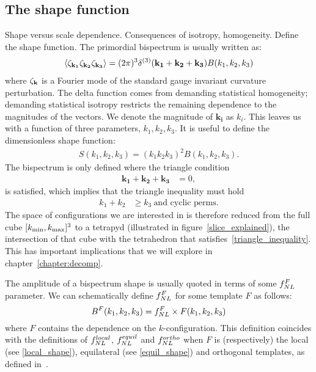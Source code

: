     \subsection{The shape function}
    Shape versus scale dependence.
    Consequences of isotropy, homogeneity.
    Define the shape function.
The primordial bispectrum is usually written as:
\begin{align}
{
\left< \zeta_{\bf{k_1}}\zeta_{\bf{k_2}}\zeta_{\bf{k_3}} \right>
= (2\pi)^3\delta^{(3)}(\mathbf{k_1}+\mathbf{k_2}+\mathbf{k_3})B(k_1,k_2,k_3)
}
\end{align}
where $\zeta_{\bf{k}}$ is a Fourier mode of the standard gauge invariant curvature perturbation.
The delta function comes from demanding statistical homogeneity;
demanding statistical isotropy restricts the remaining dependence to the magnitudes of the vectors.
We denote the magnitude of $\mathbf{k_i}$ as $k_i$.
This leaves us with a function of three parameters,
$k_1,k_2,k_3$.
It is useful to define the dimensionless shape function:
\begin{align}\label{shapefn}
{
    S(k_1,k_2,k_3) = (k_1k_2k_3)^2B(k_1,k_2,k_3).
}
\end{align}
The bispectrum is only defined where the triangle condition
\begin{align}\label{triangle_condition}
    \mathbf{k_1}+\mathbf{k_2}+\mathbf{k_3} &= 0,
\end{align}
is satisfied, which implies that the triangle inequality must hold
\begin{align}\label{triangle_inequality}
    k_1+k_2 &\geq k_3~\text{and cyclic perms}.
\end{align}
The space of configurations we are interested in is therefore
reduced from the full cube $[{k_\text{min}},{k_\text{max}}]^3$
to a tetrapyd (illustrated in figure~\ref{slice_explained}),
the intersection of that cube with the
tetrahedron that satisfies~\eqref{triangle_inequality}.
This has important implications that we will explore in
chapter~\ref{chapter:decomp}. 


The amplitude of a bispectrum shape is usually
quoted in terms of some $f_{NL}^F$ parameter.
We can schematically define $f_{NL}^F$ for some template $F$ as follows:
\begin{equation}\label{def:fnl}
{
B^{F}(k_1,k_2,k_3) = f_{NL}^{F}\times F(k_1,k_2,k_3)
}
\end{equation}
where $F$ contains the dependence on the $k$-configuration.
This definition coincides with the definitions of
$f^{local}_{NL}$, $f^{equil}_{NL}$ and $f^{ortho}_{NL}$
when $F$ is (respectively) the local (see \eqref{local_shape}),
equilateral (see \eqref{equil_shape}) and orthogonal templates,
as defined in~\cite{Planck_NG_2015}.

